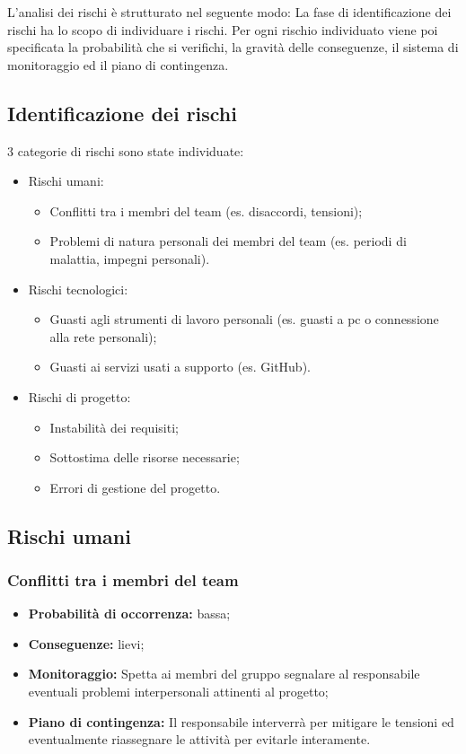 L'analisi dei rischi è strutturato nel seguente modo:
La fase di identificazione dei rischi ha lo scopo di individuare i rischi.
Per ogni rischio individuato viene poi specificata la probabilità che si verifichi,
la gravità delle conseguenze, il sistema di monitoraggio ed il piano di contingenza.
\subsection{Identificazione dei rischi}
3 categorie di rischi sono state individuate:
\begin{itemize}
\item Rischi umani:
	\begin{itemize}
	\item Conflitti tra i membri del team (es. disaccordi, tensioni);
	\item Problemi di natura personali dei membri del team (es. periodi di malattia, impegni personali).
	\end{itemize}
\item Rischi tecnologici:
	\begin{itemize}
	\item Guasti agli strumenti di lavoro personali (es. guasti a pc o connessione alla rete personali);
	\item Guasti ai servizi usati a supporto (es. GitHub).
	\end{itemize}
\item Rischi di progetto:
	\begin{itemize}
	\item Instabilità dei requisiti;
	\item Sottostima delle risorse necessarie;
	\item Errori di gestione del progetto.
	\end{itemize}
\end{itemize}
\subsection{Rischi umani}
\subsubsection{Conflitti tra i membri del team}
\begin{itemize}
\item \textbf{Probabilità di occorrenza:} bassa;
\item \textbf{Conseguenze:} lievi;
\item \textbf{Monitoraggio:} Spetta ai membri del gruppo segnalare al responsabile eventuali problemi interpersonali attinenti al progetto;
\item \textbf{Piano di contingenza:} Il responsabile interverrà per mitigare le tensioni ed eventualmente riassegnare le attività per evitarle interamente.
\end{itemize}
